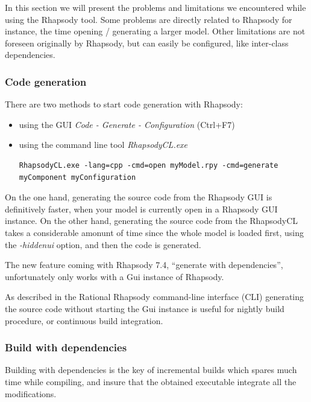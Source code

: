\documentclass[dvips]{imsart}
\begin{document}
In this section we will present the problems and limitations we encountered
while using the Rhapsody tool. Some problems are directly related to Rhapsody
for instance, the time opening / generating a larger model. Other limitations
are not foreseen originally by Rhapsody, but can easily be configured, like
inter-class dependencies.

\subsubsection{Code generation}
There are two methods to start code generation with Rhapsody:
\begin{itemize}
  \item using the GUI \emph{Code - Generate - Configuration} (Ctrl+F7)
  \item using the command line tool \emph{RhapsodyCL.exe}
  \begin{verbatim}
RhapsodyCL.exe -lang=cpp -cmd=open myModel.rpy -cmd=generate
myComponent myConfiguration
\end{verbatim}
\end{itemize}

On the one hand, generating the source code from the Rhapsody GUI is
definitively faster, when your model is currently open in a Rhapsody GUI
instance. On the other hand, generating the source code from the RhapsodyCL
takes a considerable amonunt of time since the whole model is loaded first,
using the \emph{-hiddenui} option, and then the code is generated.

The new feature coming with Rhapsody 7.4, ``generate with dependencies'',
unfortunately only works with a Gui instance of Rhapsody.

As described in the Rational Rhapsody command-line interface (CLI)
\cite{RhpUsrGuide-09} generating the source code without starting the Gui
instance is useful for nightly build procedure, or continuous build integration.
 
\subsubsection{Build with dependencies}
Building with dependencies is the key of incremental builds which spares much
time while compiling, and insure that the obtained executable integrate all the
modifications.
\end{document}
